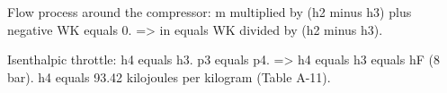Flow process around the compressor:  
m multiplied by (h2 minus h3) plus negative WK equals 0.  
=> in equals WK divided by (h2 minus h3).  

Isenthalpic throttle:  
h4 equals h3.  
p3 equals p4.  
=> h4 equals h3 equals hF (8 bar).  
h4 equals 93.42 kilojoules per kilogram (Table A-11).